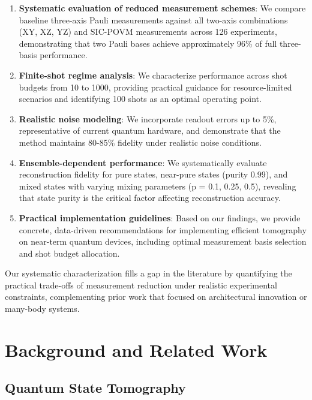 \documentclass[conference]{IEEEtran}
\begin{document}
\begin{enumerate}
    \item \textbf{Systematic evaluation of reduced measurement schemes}: We compare baseline three-axis Pauli measurements against all two-axis combinations (XY, XZ, YZ) and SIC-POVM measurements across 126 experiments, demonstrating that two Pauli bases achieve approximately 96\% of full three-basis performance.
    
    \item \textbf{Finite-shot regime analysis}: We characterize performance across shot budgets from 10 to 1000, providing practical guidance for resource-limited scenarios and identifying 100 shots as an optimal operating point.
    
    \item \textbf{Realistic noise modeling}: We incorporate readout errors up to 5\%, representative of current quantum hardware, and demonstrate that the method maintains 80-85\% fidelity under realistic noise conditions.
    
    \item \textbf{Ensemble-dependent performance}: We systematically evaluate reconstruction fidelity for pure states, near-pure states (purity 0.99), and mixed states with varying mixing parameters (p = 0.1, 0.25, 0.5), revealing that state purity is the critical factor affecting reconstruction accuracy.
    
    \item \textbf{Practical implementation guidelines}: Based on our findings, we provide concrete, data-driven recommendations for implementing efficient tomography on near-term quantum devices, including optimal measurement basis selection and shot budget allocation.
\end{enumerate}

Our systematic characterization fills a gap in the literature by quantifying the practical trade-offs of measurement reduction under realistic experimental constraints, complementing prior work that focused on architectural innovation or many-body systems.

\section{Background and Related Work}

\subsection{Quantum State Tomography}
\end{document}
